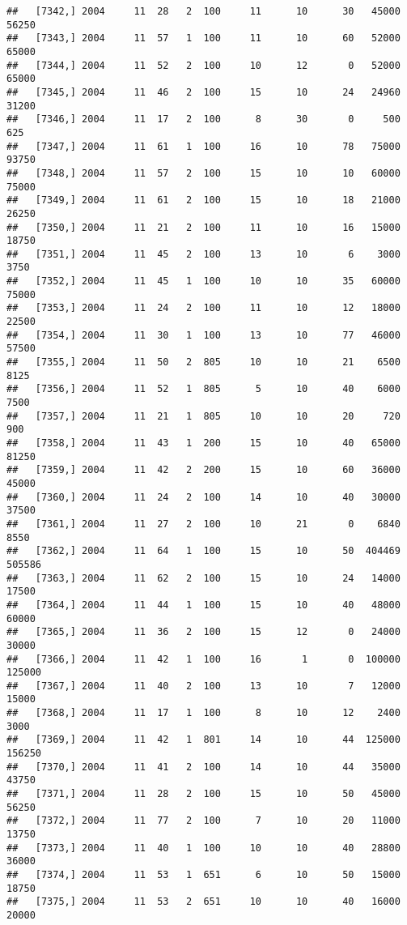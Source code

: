 \documentclass{article}\usepackage[]{graphicx}\usepackage[]{color}
\makeatletter
\newenvironment{kframe}{%
 \def\at@end@of@kframe{}%
 \ifinner\ifhmode%
  \def\at@end@of@kframe{\end{minipage}}%
  \begin{minipage}{\columnwidth}%
 \fi\fi%
 \def\FrameCommand##1{\hskip\@totalleftmargin \hskip-\fboxsep
 \colorbox{shadecolor}{##1}\hskip-\fboxsep
     \hskip-\linewidth \hskip-\@totalleftmargin \hskip\columnwidth}%
 \MakeFramed {\advance\hsize-\width
   \@totalleftmargin\z@ \linewidth\hsize
   \@setminipage}}%
 {\par\unskip\endMakeFramed%
 \at@end@of@kframe}
\newenvironment{knitrout}{}{} %
\makeatother
\begin{document}
\begin{knitrout}
\begin{kframe}
\begin{verbatim}
##   [7342,] 2004     11  28   2  100     11      10      30   45000   56250
##   [7343,] 2004     11  57   1  100     11      10      60   52000   65000
##   [7344,] 2004     11  52   2  100     10      12       0   52000   65000
##   [7345,] 2004     11  46   2  100     15      10      24   24960   31200
##   [7346,] 2004     11  17   2  100      8      30       0     500     625
##   [7347,] 2004     11  61   1  100     16      10      78   75000   93750
##   [7348,] 2004     11  57   2  100     15      10      10   60000   75000
##   [7349,] 2004     11  61   2  100     15      10      18   21000   26250
##   [7350,] 2004     11  21   2  100     11      10      16   15000   18750
##   [7351,] 2004     11  45   2  100     13      10       6    3000    3750
##   [7352,] 2004     11  45   1  100     10      10      35   60000   75000
##   [7353,] 2004     11  24   2  100     11      10      12   18000   22500
##   [7354,] 2004     11  30   1  100     13      10      77   46000   57500
##   [7355,] 2004     11  50   2  805     10      10      21    6500    8125
##   [7356,] 2004     11  52   1  805      5      10      40    6000    7500
##   [7357,] 2004     11  21   1  805     10      10      20     720     900
##   [7358,] 2004     11  43   1  200     15      10      40   65000   81250
##   [7359,] 2004     11  42   2  200     15      10      60   36000   45000
##   [7360,] 2004     11  24   2  100     14      10      40   30000   37500
##   [7361,] 2004     11  27   2  100     10      21       0    6840    8550
##   [7362,] 2004     11  64   1  100     15      10      50  404469  505586
##   [7363,] 2004     11  62   2  100     15      10      24   14000   17500
##   [7364,] 2004     11  44   1  100     15      10      40   48000   60000
##   [7365,] 2004     11  36   2  100     15      12       0   24000   30000
##   [7366,] 2004     11  42   1  100     16       1       0  100000  125000
##   [7367,] 2004     11  40   2  100     13      10       7   12000   15000
##   [7368,] 2004     11  17   1  100      8      10      12    2400    3000
##   [7369,] 2004     11  42   1  801     14      10      44  125000  156250
##   [7370,] 2004     11  41   2  100     14      10      44   35000   43750
##   [7371,] 2004     11  28   2  100     15      10      50   45000   56250
##   [7372,] 2004     11  77   2  100      7      10      20   11000   13750
##   [7373,] 2004     11  40   1  100     10      10      40   28800   36000
##   [7374,] 2004     11  53   1  651      6      10      50   15000   18750
##   [7375,] 2004     11  53   2  651     10      10      40   16000   20000

\end{verbatim}
\end{kframe}
\end{knitrout}
\end{document}
